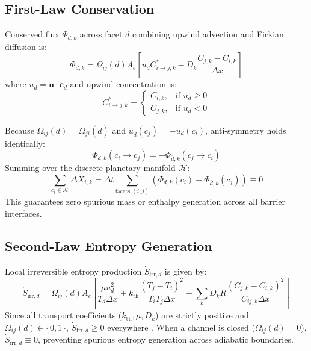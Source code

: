 \documentclass[10pt,twocolumn,letterpaper]{article}
\begin{document}
\subsection{First-Law Conservation}
Conserved flux $\Phi_{d, k}$ across facet $d$ combining upwind advection and Fickian diffusion is:
\begin{equation}
  \Phi_{d, k} = \Omega_{ij}(d) A_e \left[ u_d C_{i \to j, k}^* - D_k \frac{C_{j, k} - C_{i, k}}{\Delta x} \right]
\end{equation}
where $u_d = \mathbf{u} \cdot \mathbf{e}_d$ and upwind concentration is:
\begin{equation}
  C_{i \to j, k}^* = \begin{cases}
    C_{i, k}, & \text{if } u_d \ge 0 \\
    C_{j, k}, & \text{if } u_d < 0
  \end{cases}
\end{equation}

Because $\Omega_{ij}(d) = \Omega_{ji}(\bar{d})$ and $u_{\bar{d}}(c_j) = -u_d(c_i)$, anti-symmetry holds identically:
\begin{equation}
  \Phi_{d, k}(c_i \to c_j) = -\Phi_{\bar{d}, k}(c_j \to c_i)
\end{equation}
Summing over the discrete planetary manifold $\mathcal{H}$:
\begin{equation}
  \sum_{c_i \in \mathcal{H}} \Delta X_{i, k} = \Delta t \sum_{\text{facets } (i, j)} \left( \Phi_{d, k}(c_i) + \Phi_{\bar{d}, k}(c_j) \right) \equiv 0
\end{equation}
This guarantees zero spurious mass or enthalpy generation across all barrier interfaces.

\subsection{Second-Law Entropy Generation}
Local irreversible entropy production $\dot{S}_{\text{irr}, d}$ is given by:
\begin{equation}
  \dot{S}_{\text{irr}, d} = \Omega_{ij}(d) A_e \left[ \frac{\mu u_d^2}{T_d \Delta x} + k_{\text{th}} \frac{(T_j - T_i)^2}{T_i T_j \Delta x} + \sum_k D_k R \frac{(C_{j, k} - C_{i, k})^2}{C_{ij, k} \Delta x} \right]
\end{equation}
Since all transport coefficients ($k_{\text{th}}, \mu, D_k$) are strictly positive and $\Omega_{ij}(d) \in \{0, 1\}$, $\dot{S}_{\text{irr}, d} \ge 0$ everywhere \cite{kondepudi2014}. When a channel is closed ($\Omega_{ij}(d) = 0$), $\dot{S}_{\text{irr}, d} \equiv 0$, preventing spurious entropy generation across adiabatic boundaries.
\end{document}
